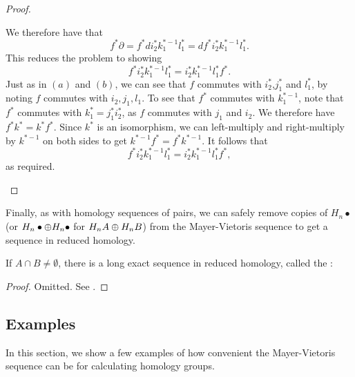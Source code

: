 \begin{proof}
\begin{enumerate}[(a)]
We therefore have that $$f^*\partial=f^*di^*_2k_1^{*-1}l_1^*=df^*i^*_2k_1^{*-1}l_1^*.$$
This reduces the problem to showing 
$$f^*i^*_2k_1^{*-1}l_1^*=i^*_2k_1^{*-1}l_1^*f^*.$$
Just as in $(a)$ and $(b)$, we can see that $f$ commutes with $i^*_2$,$j_1^*$ and $l_1^*$, by noting $f$ commutes with $i_2,j_1,l_1$. To see that $f^*$ commutes with $k_1^{*-1}$, note that $f^*$ commutes with $k_1^*=j_1^*i_2^*$, as $f$ commutes with $j_1$ and $i_2$. We therefore have $f^*k^*=k^*f^*$. Since $k^*$ is an isomorphism, we can left-multiply and right-multiply by $k^{*-1}$ on both sides to get
$k^{*-1}f^*=f^*k^{*-1}.$ It follows that $$f^*i^*_2k_1^{*-1}l_1^*=i^*_2k_1^{*-1}l_1^*f^*,$$ as required.
\end{enumerate}
\end{proof}

Finally, as with homology sequences of pairs, we can safely remove copies of $H_n\bullet$ (or $H_n\bullet\oplus H_n\bullet$ for $H_nA\oplus H_n B$) from the Mayer-Vietoris sequence to get a sequence in reduced homology.

\begin{prop}
If $A\cap B\neq \emptyset$, there is a long exact sequence in reduced homology, called the : 

\end{prop}

\begin{proof}
Omitted. See \cite{Spanier}.
\end{proof}

\subsection{Examples}
In this section, we show a few examples of how convenient the Mayer-Vietoris sequence can be for calculating homology groups.

